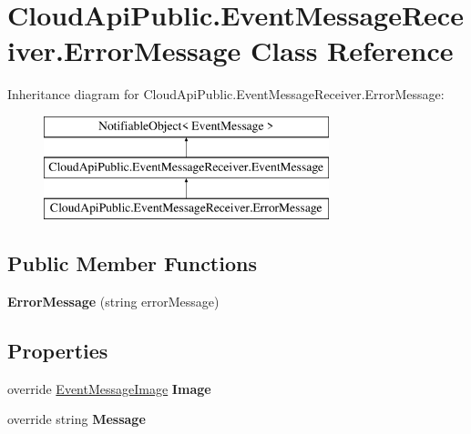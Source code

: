 \hypertarget{class_cloud_api_public_1_1_event_message_receiver_1_1_error_message}{\section{Cloud\-Api\-Public.\-Event\-Message\-Receiver.\-Error\-Message Class Reference}
\label{class_cloud_api_public_1_1_event_message_receiver_1_1_error_message}
}
Inheritance diagram for Cloud\-Api\-Public.\-Event\-Message\-Receiver.\-Error\-Message\-:\begin{figure}[H]
\begin{center}
\leavevmode
\includegraphics[height=3.000000cm]{class_cloud_api_public_1_1_event_message_receiver_1_1_error_message}
\end{center}
\end{figure}
\subsection*{Public Member Functions}
\begin{DoxyCompactItemize}
\item 
\hypertarget{class_cloud_api_public_1_1_event_message_receiver_1_1_error_message_af964d1373bf4b58a20bec7bbd4292c93}{{\bfseries Error\-Message} (string error\-Message)}\label{class_cloud_api_public_1_1_event_message_receiver_1_1_error_message_af964d1373bf4b58a20bec7bbd4292c93}

\end{DoxyCompactItemize}
\subsection*{Properties}
\begin{DoxyCompactItemize}
\item 
\hypertarget{class_cloud_api_public_1_1_event_message_receiver_1_1_error_message_a43ae4a77f9d7d832966cf693b2949d74}{override \hyperlink{namespace_cloud_api_public_1_1_static_aefcc1e7e1c81366ec3f6affd41c1f817}{Event\-Message\-Image} {\bfseries Image}}\label{class_cloud_api_public_1_1_event_message_receiver_1_1_error_message_a43ae4a77f9d7d832966cf693b2949d74}

\item 
\hypertarget{class_cloud_api_public_1_1_event_message_receiver_1_1_error_message_a129477aeb39fd7ad944e542f5df9ed39}{override string {\bfseries Message}}\label{class_cloud_api_public_1_1_event_message_receiver_1_1_error_message_a129477aeb39fd7ad944e542f5df9ed39}

\end{DoxyCompactItemize}
